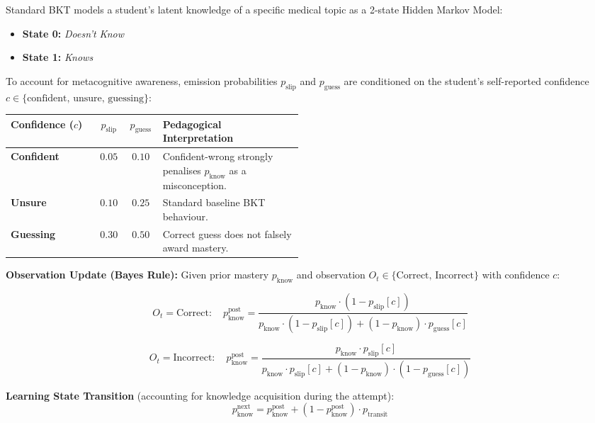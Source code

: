 Standard BKT models a student's latent knowledge of a specific medical topic as a 2-state
Hidden Markov Model:

\begin{itemize}
    \item \textbf{State 0:} \textit{Doesn't Know}
    \item \textbf{State 1:} \textit{Knows}
\end{itemize}

To account for metacognitive awareness, emission probabilities $p_{\text{slip}}$ and
$p_{\text{guess}}$ are conditioned on the student's self-reported confidence
$c \in \{\text{confident},\,\text{unsure},\,\text{guessing}\}$:

\begin{center}
\begin{tabular}{|l|c|c|>{\raggedright\arraybackslash}p{0.48\linewidth}|}
\hline
\textbf{Confidence ($c$)} & $p_{\text{slip}}$ & $p_{\text{guess}}$ & \textbf{Pedagogical Interpretation} \\
\hline
\textbf{Confident} & $0.05$ & $0.10$ & Confident-wrong strongly penalises $p_{\text{know}}$ as a misconception. \\
\hline
\textbf{Unsure} & $0.10$ & $0.25$ & Standard baseline BKT behaviour. \\
\hline
\textbf{Guessing} & $0.30$ & $0.50$ & Correct guess does not falsely award mastery. \\
\hline
\end{tabular}
\end{center}

\textbf{Observation Update (Bayes Rule):} Given prior mastery $p_{\text{know}}$ and observation
$O_t \in \{\text{Correct},\,\text{Incorrect}\}$ with confidence $c$:

\[
O_t = \text{Correct}: \quad
p_{\text{know}}^{\text{post}} = \frac{p_{\text{know}} \cdot (1 - p_{\text{slip}}[c])}
  {p_{\text{know}} \cdot (1 - p_{\text{slip}}[c]) + (1 - p_{\text{know}}) \cdot p_{\text{guess}}[c]}
\]

\[
O_t = \text{Incorrect}: \quad
p_{\text{know}}^{\text{post}} = \frac{p_{\text{know}} \cdot p_{\text{slip}}[c]}
  {p_{\text{know}} \cdot p_{\text{slip}}[c] + (1 - p_{\text{know}}) \cdot (1 - p_{\text{guess}}[c])}
\]

\textbf{Learning State Transition} (accounting for knowledge acquisition during the attempt):
\[
p_{\text{know}}^{\text{next}} = p_{\text{know}}^{\text{post}} + (1 - p_{\text{know}}^{\text{post}}) \cdot p_{\text{transit}}
\]

